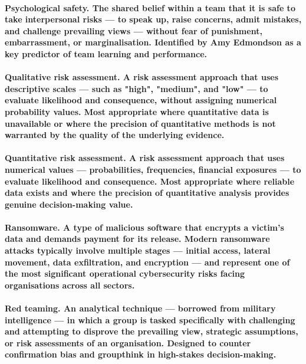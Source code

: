 \paragraph{\textbf{Psychological safety}. The shared belief within a team that it is safe to take interpersonal risks — to speak up, raise concerns, admit mistakes, and challenge prevailing views — without fear of punishment, embarrassment, or marginalisation. Identified by Amy Edmondson as a key predictor of team learning and performance.}

\paragraph{\textbf{Qualitative risk assessment}. A risk assessment approach that uses descriptive scales — such as "high", "medium", and "low" — to evaluate likelihood and consequence, without assigning numerical probability values. Most appropriate where quantitative data is unavailable or where the precision of quantitative methods is not warranted by the quality of the underlying evidence.}

\paragraph{\textbf{Quantitative risk assessment}. A risk assessment approach that uses numerical values — probabilities, frequencies, financial exposures — to evaluate likelihood and consequence. Most appropriate where reliable data exists and where the precision of quantitative analysis provides genuine decision-making value.}

\paragraph{\textbf{Ransomware}. A type of malicious software that encrypts a victim's data and demands payment for its release. Modern ransomware attacks typically involve multiple stages — initial access, lateral movement, data exfiltration, and encryption — and represent one of the most significant operational cybersecurity risks facing organisations across all sectors.}

\paragraph{\textbf{Red teaming}. An analytical technique — borrowed from military intelligence — in which a group is tasked specifically with challenging and attempting to disprove the prevailing view, strategic assumptions, or risk assessments of an organisation. Designed to counter confirmation bias and groupthink in high-stakes decision-making.}


